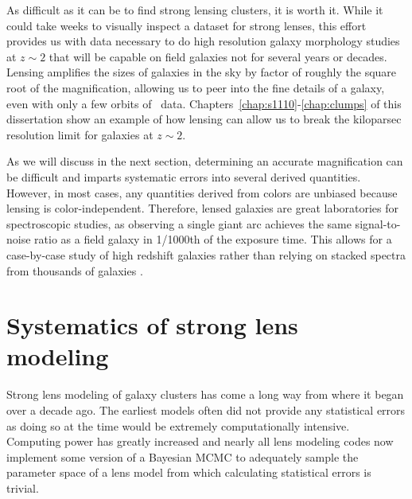 As difficult as it can be to find strong lensing clusters, it is worth it. While it could take weeks to visually inspect a dataset for strong lenses, this effort provides us with data necessary to do high resolution galaxy morphology studies at $z\sim2$ that will be capable on field galaxies not for several years or decades. Lensing amplifies the sizes of galaxies in the sky by factor of roughly the square root of the magnification, allowing us to peer into the fine details of a galaxy, even with only a few orbits of \hst\ data. Chapters~\ref{chap:s1110}-\ref{chap:clumps} of this dissertation show an example of how lensing can allow us to break the kiloparsec resolution limit for galaxies at $z\sim2$. 

As we will discuss in the next section, determining an accurate magnification can be difficult and imparts systematic errors into several derived quantities. However, in most cases, any quantities derived from colors are unbiased because lensing is color-independent. Therefore, lensed galaxies are great laboratories for spectroscopic studies, as observing a single giant arc achieves the same signal-to-noise ratio as a field galaxy in 1/1000th of the exposure time. This allows for a case-by-case study of high redshift galaxies \citep[e.g., ][]{Rigby:2018hs,Rigby:2017yb} rather than relying on stacked spectra from thousands of galaxies \citep[e.g., ][]{Shapley:2003fk}.

\section{Systematics of strong lens modeling}

Strong lens modeling of galaxy clusters has come a long way from where it began over a decade ago. The earliest models often did not provide any statistical errors as doing so at the time would be extremely computationally intensive. Computing power has greatly increased and nearly all lens modeling codes now implement some version of a Bayesian MCMC to adequately sample the parameter space of a lens model from which calculating statistical errors is trivial.

